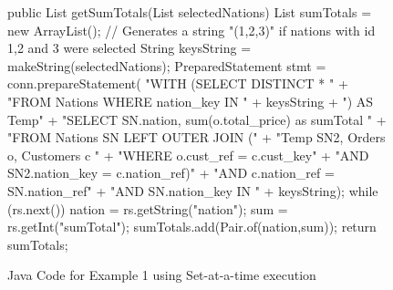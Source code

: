 \documentclass[10pt]{article}
\begin{document}
\begin{appendices}
\begin{figure}[h]
\centering
\begin{Java}[basicstyle=\small]
public List getSumTotals(List selectedNations) {
     List sumTotals = new ArrayList();
     // Generates a string "(1,2,3)" if nations with id 1,2 and 3 were selected
     String keysString = makeString(selectedNations);
     PreparedStatement stmt = conn.prepareStatement(
        "WITH (SELECT DISTINCT * "
        + "FROM Nations WHERE nation_key IN " + keysString
        + ") AS Temp"
        +  "SELECT SN.nation, sum(o.total_price) as sumTotal "
        + "FROM Nations SN LEFT OUTER JOIN ("
        + "Temp SN2, Orders o, Customers c "
        + "WHERE o.cust_ref = c.cust_key"
        + "AND SN2.nation_key = c.nation_ref)"
        + "AND c.nation_ref = SN.nation_ref"
        + "AND SN.nation_key IN " + keysString);
     while (rs.next()) {
     	nation = rs.getString("nation");
	sum = rs.getInt("sumTotal");
     	sumTotals.add(Pair.of(nation,sum));
     }
     return sumTotals;
}
\end{Java}
\caption{Java Code for Example 1 using Set-at-a-time execution}
\label{fig:code2}
\end{figure}
\end{appendices}
\end{document}
